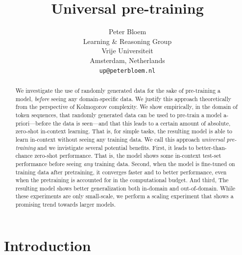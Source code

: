 \documentclass{article} %
\title{Universal pre-training}
\author{Peter Bloem \\
Learning \& Reasoning Group\\
Vrije Universiteit \\
Amsterdam, Netherlands \\
\texttt{up@peterbloem.nl} \\
}
\begin{document}
\maketitle

\begin{abstract}
We investigate the use of randomly generated data for the sake of pre-training a model, \emph{before} seeing any domain-specific data. We justify this approach theoretically from the perspective of Kolmogorov complexity. We show empirically, in the domain of token sequences, that randomly generated data can be used to pre-train a model a-priori---before the data is seen---and that this leads to a certain amount of absolute, zero-shot in-context learning. That is, for simple tasks, the resulting model is able to learn in-context without seeing any training data. We call this approach \emph{universal pre-training} and we invistigate several potential benefits. First, it leads to better-than-chance zero-shot performance. That is, the model shows some in-context test-set performance before seeing \emph{any} training data. Second, when the model is fine-tuned on training data after pretraining, it converges faster and to better performance, even when the pretraining is accounted for in the computational budget. And third, The resulting model shows better generalization both in-domain and out-of-domain. While these experiments are only small-scale, we perform a scaling experiment that shows a promising trend towards larger models.
\end{abstract}

\section{Introduction}
\end{document}
